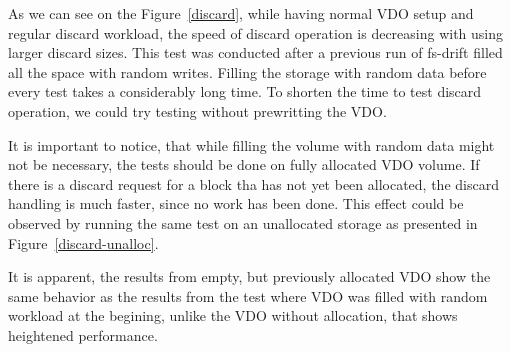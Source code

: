 \documentclass[
  color, %
  table, %
  lof,   %
  lot,   %
]{fithesis3}
\begin{document}
As we can see on the Figure~\ref{discard}, while having normal VDO setup and regular discard workload, the speed of discard operation is decreasing with using larger discard sizes. This test was conducted after a previous run of fs-drift filled all the space with random writes. Filling the storage with random data before every test takes a considerably long time. To shorten the time to test discard operation, we could try testing without prewritting the VDO.

It is important to notice, that while filling the volume with random data might not be necessary, the tests should be done on fully allocated VDO volume. If there is a discard request for a block tha has not yet been allocated, the discard handling is much faster, since no work has been done. This effect could be observed by running the same test on an unallocated storage as presented in Figure~\ref{discard-unalloc}.

It is apparent, the results from empty, but previously allocated VDO show the same behavior as the results from the test where VDO was filled with random workload at the begining, unlike the VDO without allocation, that shows heightened performance.
\end{document}
